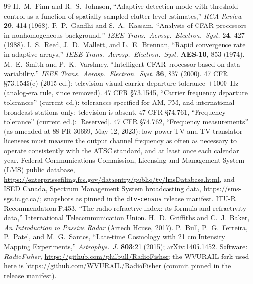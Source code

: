 \begin{thebibliography}{99}
 H.~M.~Finn and R.~S.~Johnson, ``Adaptive detection mode with threshold control as a function of spatially sampled clutter-level estimates,'' \emph{RCA Review} \textbf{29}, 414 (1968).
 P.~P.~Gandhi and S.~A.~Kassam, ``Analysis of CFAR processors in nonhomogeneous background,'' \emph{IEEE Trans.\ Aerosp.\ Electron.\ Syst.} \textbf{24}, 427 (1988).
 I.~S.~Reed, J.~D.~Mallett, and L.~E.~Brennan, ``Rapid convergence rate in adaptive arrays,'' \emph{IEEE Trans.\ Aerosp.\ Electron.\ Syst.} \textbf{AES-10}, 853 (1974).
 M.~E.~Smith and P.~K.~Varshney, ``Intelligent CFAR processor based on data variability,'' \emph{IEEE Trans.\ Aerosp.\ Electron.\ Syst.} \textbf{36}, 837 (2000).
 47 CFR \S 73.1545(c) (2015 ed.): television visual-carrier departure tolerance $\pm 1000$~Hz (analog-era rule, since removed).
 47 CFR \S 73.1545, ``Carrier frequency departure tolerances'' (current ed.): tolerances specified for AM, FM, and international broadcast stations only; television is absent.
 47 CFR \S 74.761, ``Frequency tolerance'' (current ed.): [Reserved].
 47 CFR \S 74.762, ``Frequency measurements'' (as amended at 88 FR 30669, May 12, 2023): low power TV and TV translator licensees must measure the output channel frequency as often as necessary to operate consistently with the ATSC standard, and at least once each calendar year.
 Federal Communications Commission, Licensing and Management System (LMS) public database, \url{https://enterpriseefiling.fcc.gov/dataentry/public/tv/lmsDatabase.html}, and ISED Canada, Spectrum Management System broadcasting data, \url{https://sms-sgs.ic.gc.ca/}; snapshots as pinned in the \texttt{dtv-census} release manifest.
 ITU-R Recommendation P.453, ``The radio refractive index: its formula and refractivity data,'' International Telecommunication Union.
 H.~D.~Griffiths and C.~J.~Baker, \emph{An Introduction to Passive Radar} (Artech House, 2017).
 P.~Bull, P.~G.~Ferreira, P.~Patel, and M.~G.~Santos, ``Late-time Cosmology with 21 cm Intensity Mapping Experiments,'' \emph{Astrophys.\ J.} \textbf{803}:21 (2015); arXiv:1405.1452. Software: \emph{RadioFisher}, \url{https://github.com/philbull/RadioFisher}; the WVURAIL fork used here is \url{https://github.com/WVURAIL/RadioFisher} (commit pinned in the release manifest).

\end{thebibliography}
